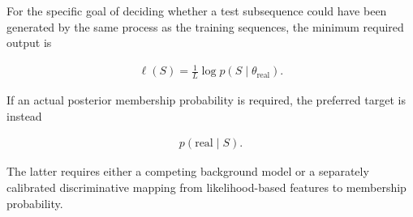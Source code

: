 \documentclass[a4paper]{article}
\begin{document}
        For the specific goal of deciding whether a test subsequence could have been generated by the same process as the training sequences, the minimum required output is

        \begin{align}
            \boxed{
            \ell(S)
            =
            \frac{1}{L}\log p(S\mid\theta_{\mathrm{real}})
            }.
        \end{align}

        \noindent
        If an actual posterior membership probability is required, the preferred target is instead

        \begin{align}
            \boxed{
            p(\mathrm{real}\mid S)
            }.
        \end{align}

        \noindent
        The latter requires either a competing background model or a separately calibrated discriminative mapping from likelihood-based features to membership probability.

        
        
\end{document}
